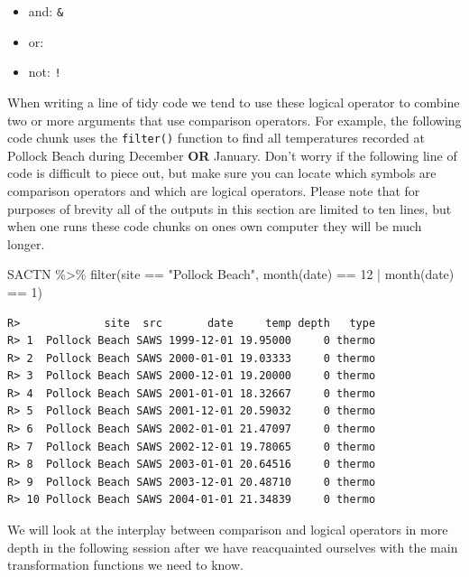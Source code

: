 \documentclass[
]{book}
\newenvironment{Shaded}{\begin{snugshade}}{\end{snugshade}}
\newcommand{\DecValTok}[1]{\textcolor[rgb]{0.00,0.00,0.81}{#1}}
\newcommand{\FunctionTok}[1]{\textcolor[rgb]{0.00,0.00,0.00}{#1}}
\newcommand{\NormalTok}[1]{#1}
\newcommand{\SpecialCharTok}[1]{\textcolor[rgb]{0.00,0.00,0.00}{#1}}
\newcommand{\StringTok}[1]{\textcolor[rgb]{0.31,0.60,0.02}{#1}}
\providecommand{\tightlist}{%
  \setlength{\itemsep}{0pt}\setlength{\parskip}{0pt}}
\begin{document}
\begin{itemize}
\tightlist
\item
  and: \texttt{\&}\\
\item
  or: \texttt{\textbar{}}\\
\item
  not: \texttt{!}
\end{itemize}

When writing a line of tidy code we tend to use these logical operator to combine two or more arguments that use comparison operators. For example, the following code chunk uses the \texttt{filter()} function to find all temperatures recorded at Pollock Beach during December \textbf{OR} January. Don't worry if the following line of code is difficult to piece out, but make sure you can locate which symbols are comparison operators and which are logical operators. Please note that for purposes of brevity all of the outputs in this section are limited to ten lines, but when one runs these code chunks on ones own computer they will be much longer.

\begin{Shaded}
\begin{Highlighting}[]
\NormalTok{SACTN }\SpecialCharTok{\%\textgreater{}\%} 
  \FunctionTok{filter}\NormalTok{(site }\SpecialCharTok{==} \StringTok{"Pollock Beach"}\NormalTok{, }\FunctionTok{month}\NormalTok{(date) }\SpecialCharTok{==} \DecValTok{12} \SpecialCharTok{|} \FunctionTok{month}\NormalTok{(date) }\SpecialCharTok{==} \DecValTok{1}\NormalTok{)}
\end{Highlighting}
\end{Shaded}

\begin{verbatim}
R>             site  src       date     temp depth   type
R> 1  Pollock Beach SAWS 1999-12-01 19.95000     0 thermo
R> 2  Pollock Beach SAWS 2000-01-01 19.03333     0 thermo
R> 3  Pollock Beach SAWS 2000-12-01 19.20000     0 thermo
R> 4  Pollock Beach SAWS 2001-01-01 18.32667     0 thermo
R> 5  Pollock Beach SAWS 2001-12-01 20.59032     0 thermo
R> 6  Pollock Beach SAWS 2002-01-01 21.47097     0 thermo
R> 7  Pollock Beach SAWS 2002-12-01 19.78065     0 thermo
R> 8  Pollock Beach SAWS 2003-01-01 20.64516     0 thermo
R> 9  Pollock Beach SAWS 2003-12-01 20.48710     0 thermo
R> 10 Pollock Beach SAWS 2004-01-01 21.34839     0 thermo
\end{verbatim}

We will look at the interplay between comparison and logical operators in more depth in the following session after we have reacquainted ourselves with the main transformation functions we need to know.
\end{document}
